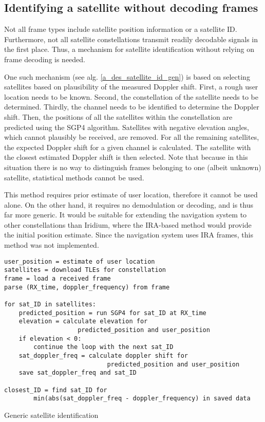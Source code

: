 \subsection{Identifying a satellite without decoding frames}
Not all frame types include satellite position information or a satellite ID. Furthermore, not all satellite constellations transmit readily decodable signals in the first place. Thus, a mechanism for satellite identification without relying on frame decoding is needed.

One such mechanism (see alg. \ref{a_des_satellite_id_gen}) is based on selecting satellites based on plausibility of the measured Doppler shift. First, a rough user location needs to be known. Second, the constellation of the satellite needs to be determined. Thirdly, the channel needs to be identified to determine the Doppler shift. Then, the positions of all the satellites within the constellation are predicted using the SGP4 algorithm. Satellites with negative elevation angles, which cannot plausibly be received, are removed. For all the remaining satellites, the expected Doppler shift for a given channel is calculated. The satellite with the closest estimated Doppler shift is then selected. Note that because in this situation there is no way to distinguish frames belonging to one (albeit unknown) satellite, statistical methods cannot be used.

This method requires prior estimate of user location, therefore it cannot be used alone. On the other hand, it requires no demodulation or decoding, and is thus far more generic. It would be suitable for extending the navigation system to other constellations than Iridium, where the IRA-based method would provide the initial position estimate. Since the navigation system uses IRA frames, this method was not implemented.

\begin{algorithm}
    \centering
    \begin{verbatim}
user_position = estimate of user location
satellites = download TLEs for constellation
frame = load a received frame
parse (RX_time, doppler_frequency) from frame

for sat_ID in satellites:
    predicted_position = run SGP4 for sat_ID at RX_time
    elevation = calculate elevation for
                    predicted_position and user_position
    if elevation < 0:
        continue the loop with the next sat_ID
    sat_doppler_freq = calculate doppler shift for
                            predicted_position and user_position
    save sat_doppler_freq and sat_ID

closest_ID = find sat_ID for
        min(abs(sat_doppler_freq - doppler_frequency) in saved data
    \end{verbatim}
    \caption{Generic satellite identification}
    \label{a_des_satellite_id_gen}
\end{algorithm}


